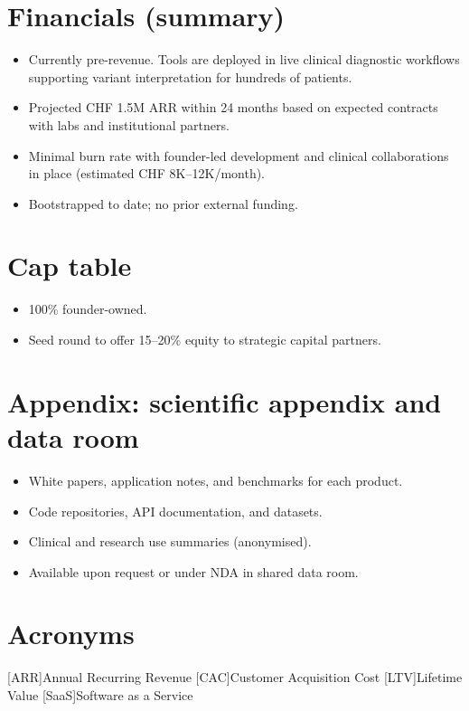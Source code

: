 \section*{Financials (summary)}
\begin{itemize}[leftmargin=*]
  \item Currently pre-revenue. Tools are deployed in live clinical diagnostic workflows supporting variant interpretation for hundreds of patients.
  \item Projected CHF 1.5M \ac{ARR} within 24 months based on expected contracts with labs and institutional partners.
  \item Minimal burn rate with founder-led development and clinical collaborations in place (estimated CHF 8K–12K/month).
  \item Bootstrapped to date; no prior external funding.
\end{itemize}

\section*{Cap table}
\begin{itemize}[leftmargin=*]
  \item 100\% founder-owned.
  \item Seed round to offer 15–20\% equity to strategic capital partners.
\end{itemize}

\section*{Appendix: scientific appendix and data room}
\begin{itemize}[leftmargin=*]
  \item White papers, application notes, and benchmarks for each product.
  \item Code repositories, API documentation, and datasets.
  \item Clinical and research use summaries (anonymised).
  \item Available upon request or under NDA in shared data room.
\end{itemize}




\section*{Acronyms}
\begin{acronym}
  [ARR]{Annual Recurring Revenue}
  [CAC]{Customer Acquisition Cost}
  [LTV]{Lifetime Value}
  [SaaS]{Software as a Service}
\end{acronym}







